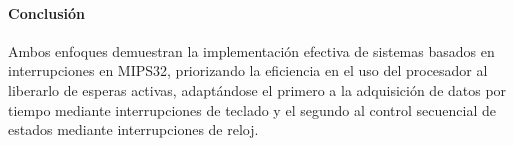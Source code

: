 \documentclass[12pt]{article}
\begin{document}
\vspace{0.3cm}

\begin{center}
\paragraph*{Conclusión}
\end{center}

\begin{center}
Ambos enfoques demuestran la implementación efectiva de sistemas basados en interrupciones en MIPS32, priorizando la eficiencia en el uso del procesador al liberarlo de esperas activas, adaptándose el primero a la adquisición de datos por tiempo mediante interrupciones de teclado y el segundo al control secuencial de estados mediante interrupciones de reloj.
\end{center}
\end{document}
